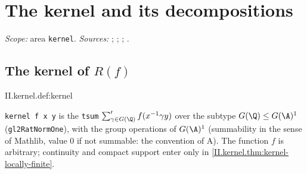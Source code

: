 
\chapter{The kernel and its decompositions}\label{ch:ch-03-kernel}

\noindent\emph{Scope:} area \texttt{kernel}. \emph{Sources:} \cite[§§1--2]{A-I}; \cite[§§4, 6, 7, 10, 12]{AIntro}; \cite[Lectures II--III]{Gel}; \cite[§§1--3]{A-R1}.


\section{\texorpdfstring{The kernel of $R(f)$}{The kernel of R(f)}}\label{sec:kernel-kernel}

\begin{definition}
\end{definition}
\begin{tfformal}{II.kernel.def:kernel}
\begin{tffidelity}
\texttt{kernel f x y} is the \texttt{tsum} $\sum'_{\gamma\in G(\Q)}f(x^{-1}\gamma y)$ over the subtype $G(\Q)\le G(\A)^1$ (\texttt{gl2RatNormOne}), with the group operations of $G(\A)^1$ (summability in the sense of Mathlib, value $0$ if not summable: the convention of A). The function $f$ is arbitrary; continuity and compact support enter only in \cref{II.kernel.thm:kernel-locally-finite}.
\end{tffidelity}
\end{tfformal}

